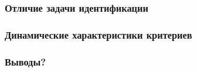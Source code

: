 \documentclass[10pt,utf8]{beamer}
\begin{document}

\begin{frame}
  \frametitle{Отличие задачи идентификации}


\end{frame}




\begin{frame}
  \frametitle{Динамические характеристики критериев}


\end{frame}




\begin{frame}
  \frametitle{Выводы?}


\end{frame}



\end{document}
